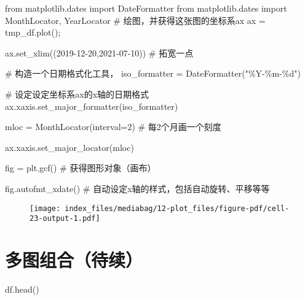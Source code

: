 \documentclass[
  letterpaper,
  DIV=11,
  numbers=noendperiod]{scrreprt}
\newenvironment{Shaded}{\begin{snugshade}}{\end{snugshade}}
\newcommand{\CommentTok}[1]{\textcolor[rgb]{0.37,0.37,0.37}{#1}}
\newcommand{\DecValTok}[1]{\textcolor[rgb]{0.68,0.00,0.00}{#1}}
\newcommand{\ImportTok}[1]{\textcolor[rgb]{0.00,0.46,0.62}{#1}}
\newcommand{\NormalTok}[1]{\textcolor[rgb]{0.00,0.23,0.31}{#1}}
\newcommand{\OperatorTok}[1]{\textcolor[rgb]{0.37,0.37,0.37}{#1}}
\newcommand{\SpecialCharTok}[1]{\textcolor[rgb]{0.37,0.37,0.37}{#1}}
\newcommand{\StringTok}[1]{\textcolor[rgb]{0.13,0.47,0.30}{#1}}
\begin{document}
\begin{Shaded}
\begin{Highlighting}[]
\ImportTok{from}\NormalTok{ matplotlib.dates }\ImportTok{import}\NormalTok{ DateFormatter}
\ImportTok{from}\NormalTok{ matplotlib.dates }\ImportTok{import}\NormalTok{ MonthLocator, YearLocator}
\CommentTok{\# 绘图，并获得这张图的坐标系ax}
\NormalTok{ax }\OperatorTok{=}\NormalTok{ tmp\_df.plot()}\OperatorTok{;}

\NormalTok{ax.set\_xlim((}\StringTok{\textquotesingle{}2019{-}12{-}20\textquotesingle{}}\NormalTok{,}\StringTok{\textquotesingle{}2021{-}07{-}10\textquotesingle{}}\NormalTok{)) }\CommentTok{\# 拓宽一点}

\CommentTok{\# 构造一个日期格式化工具，}
\NormalTok{iso\_formatter }\OperatorTok{=}\NormalTok{ DateFormatter(}\StringTok{"\%Y{-}\%m{-}}\SpecialCharTok{\%d}\StringTok{"}\NormalTok{)}

\CommentTok{\# 设定设定坐标系ax的x轴的日期格式}
\NormalTok{ax.xaxis.set\_major\_formatter(iso\_formatter)}

\NormalTok{mloc }\OperatorTok{=}\NormalTok{ MonthLocator(interval}\OperatorTok{=}\DecValTok{2}\NormalTok{) }\CommentTok{\# 每2个月画一个刻度}

\NormalTok{ax.xaxis.set\_major\_locator(mloc)}

\NormalTok{fig }\OperatorTok{=}\NormalTok{ plt.gcf() }\CommentTok{\# 获得图形对象（画布）}

\NormalTok{fig.autofmt\_xdate() }\CommentTok{\# 自动设定x轴的样式，包括自动旋转、平移等等}
\end{Highlighting}
\end{Shaded}

\begin{figure}[H]

{\centering \texttt{[image: index\_files/mediabag/12-plot\_files/figure-pdf/cell-23-output-1.pdf]}

}

\end{figure}

\hypertarget{ux591aux56feux7ec4ux5408ux5f85ux7eed}{%
\section{多图组合（待续）}\label{ux591aux56feux7ec4ux5408ux5f85ux7eed}}

\begin{Shaded}
\begin{Highlighting}[]
\NormalTok{df.head()}
\end{Highlighting}
\end{Shaded}
\end{document}
